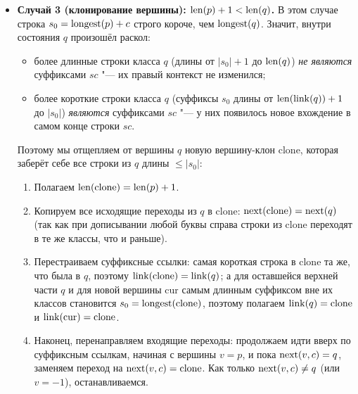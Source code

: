 \begin{itemize}
    \item \textbf{Случай 3 (клонирование вершины): $\operatorname{len}(p) + 1 < \operatorname{len}(q)$.} В этом случае строка $s_0 = \operatorname{longest}(p) + c$ строго короче, чем $\operatorname{longest}(q)$. Значит, внутри состояния $q$ произошёл раскол:
    \begin{itemize}
        \item более длинные строки класса $q$ (длины от $|s_0| + 1$ до $\operatorname{len}(q)$) \emph{не являются} суффиксами $sc$ "--- их правый контекст не изменился;
        \item более короткие строки класса $q$ (суффиксы $s_0$ длины от $\operatorname{len}(\operatorname{link}(q)) + 1$ до $|s_0|$) \emph{являются} суффиксами $sc$ "--- у них появилось новое вхождение в самом конце строки $sc$.
    \end{itemize}
    Поэтому мы отщепляем от вершины $q$ новую вершину-клон $\text{clone}$, которая заберёт себе все строки из $q$ длины $\le |s_0|$:
    \begin{enumerate}
        \item Полагаем $\operatorname{len}(\text{clone}) = \operatorname{len}(p) + 1$.
        \item Копируем все исходящие переходы из $q$ в $\text{clone}$: $\operatorname{next}(\text{clone}) = \operatorname{next}(q)$ (так как при дописывании любой буквы справа строки из $\text{clone}$ переходят в те же классы, что и раньше).
        \item Перестраиваем суффиксные ссылки: самая короткая строка в $\text{clone}$ та же, что была в $q$, поэтому $\operatorname{link}(\text{clone}) = \operatorname{link}(q)$; а для оставшейся верхней части $q$ и для новой вершины $\text{cur}$ самым длинным суффиксом вне их классов становится $s_0 = \operatorname{longest}(\text{clone})$, поэтому полагаем $\operatorname{link}(q) = \text{clone}$ и $\operatorname{link}(\text{cur}) = \text{clone}$.
        \item Наконец, перенаправляем входящие переходы: продолжаем идти вверх по суффиксным ссылкам, начиная с вершины $v = p$, и пока $\operatorname{next}(v, c) = q$, заменяем переход на $\operatorname{next}(v, c) = \text{clone}$. Как только $\operatorname{next}(v, c) \ne q$ (или $v = -1$), останавливаемся.
    \end{enumerate}
\end{itemize}

